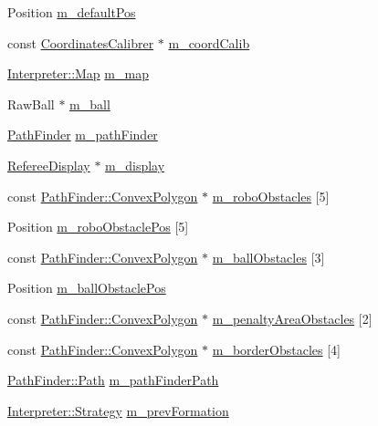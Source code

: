 \begin{DoxyCompactItemize}
\item 
Position \hyperlink{classTeamRobot_a5758854ca2d6a084bea074c39e75b5d3}{m\_\-defaultPos}
\item 
const \hyperlink{classCoordinatesCalibrer}{CoordinatesCalibrer} $\ast$ \hyperlink{classTeamRobot_a3bfcb3cdeedcc11eaed1b5bce532560f}{m\_\-coordCalib}
\item 
\hyperlink{classMatrix}{Interpreter::Map} \hyperlink{classTeamRobot_acf38fcc5b3c4ab4815fb151e39d5889c}{m\_\-map}
\item 
RawBall $\ast$ \hyperlink{classTeamRobot_ac6544ce7a73fe05e3c9a69cc50b58bbe}{m\_\-ball}
\item 
\hyperlink{classPathFinder}{PathFinder} \hyperlink{classTeamRobot_ac5845718f0d540e3f17f39d62d6f11c7}{m\_\-pathFinder}
\item 
\hyperlink{classRefereeDisplay}{RefereeDisplay} $\ast$ \hyperlink{classTeamRobot_aecbb2869966fba9b3de3cbc530c7bc36}{m\_\-display}
\item 
const \hyperlink{structPathFinder_1_1ConvexPolygon}{PathFinder::ConvexPolygon} $\ast$ \hyperlink{classTeamRobot_a9dc410e800f251d62dbde6b3791b2009}{m\_\-roboObstacles} \mbox{[}5\mbox{]}
\item 
Position \hyperlink{classTeamRobot_a5337cff2b594fd63b2445c1d49374d7e}{m\_\-roboObstaclePos} \mbox{[}5\mbox{]}
\item 
const \hyperlink{structPathFinder_1_1ConvexPolygon}{PathFinder::ConvexPolygon} $\ast$ \hyperlink{classTeamRobot_a06fd18a201a66f021e0c72dfd845e26b}{m\_\-ballObstacles} \mbox{[}3\mbox{]}
\item 
Position \hyperlink{classTeamRobot_aba2294985cc9a1dc404271e29166da82}{m\_\-ballObstaclePos}
\item 
const \hyperlink{structPathFinder_1_1ConvexPolygon}{PathFinder::ConvexPolygon} $\ast$ \hyperlink{classTeamRobot_a155fbee5f74459799332801b09c99616}{m\_\-penaltyAreaObstacles} \mbox{[}2\mbox{]}
\item 
const \hyperlink{structPathFinder_1_1ConvexPolygon}{PathFinder::ConvexPolygon} $\ast$ \hyperlink{classTeamRobot_a0292337f910ac2bbb300affb87891ba7}{m\_\-borderObstacles} \mbox{[}4\mbox{]}
\item 
\hyperlink{classPathFinder_a269aba09b7b3208092f67f2bc02cf63e}{PathFinder::Path} \hyperlink{classTeamRobot_aca22e17bd02f1ce84786ed2194764afa}{m\_\-pathFinderPath}
\item 
\hyperlink{classInterpreter_a0fb49436c8c14ca79e13f1cd78119088}{Interpreter::Strategy} \hyperlink{classTeamRobot_ab32d14c3de4fd5a6ff6db39eb04f52f2}{m\_\-prevFormation}

\end{DoxyCompactItemize}
